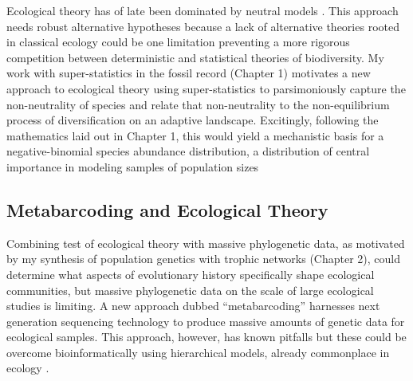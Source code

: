 Ecological theory has of late been dominated by neutral models
\citep[e.g.][]{rominger2009, rominger2015GEB}. This approach needs
robust alternative hypotheses because a lack of alternative theories
rooted in classical ecology could be one limitation preventing a more
rigorous competition between deterministic and statistical theories of
biodiversity. My work with super-statistics in the fossil record
(Chapter 1) motivates a new approach to ecological theory using
super-statistics to parsimoniously capture the non-neutrality of
species and relate that non-neutrality to the non-equilibrium process
of diversification on an adaptive landscape. Excitingly, following the
mathematics laid out in Chapter 1, this would yield a mechanistic
basis for a negative-binomial species abundance distribution, a
distribution of central importance in modeling samples of population
sizes \citep{fisher1943}

\subsection{Metabarcoding and Ecological Theory}

Combining test of ecological theory with massive phylogenetic data, as
motivated by my synthesis of population genetics with trophic networks
(Chapter 2), could determine what aspects of evolutionary history
specifically shape ecological communities, but massive phylogenetic
data on the scale of large ecological studies is limiting.  A new
approach dubbed ``metabarcoding'' \citep{taberlet2012} harnesses next
generation sequencing technology to produce massive amounts of genetic
data for ecological samples. This approach, however, has known
pitfalls \citep[e.g. bias in primer affinities between
taxa][]{clarke2014} but these could be overcome bioinformatically
using hierarchical models, already commonplace in ecology
\citep{royleDorazio}.

\printbibliography[heading=subbibliography]